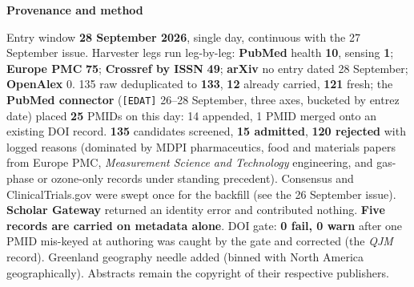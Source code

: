 \documentclass[10pt]{article}
\begin{document}
\begin{keybox}
{\sffamily\bfseries\footnotesize\color{Deep}Provenance and method}\\[1.2mm]
{\fontsize{7.2}{8.8}\selectfont
Entry window \textbf{28 September 2026}, single day, continuous with the 27 September issue.
Harvester legs run leg-by-leg: \textbf{PubMed} health \textbf{10}, sensing \textbf{1}; \textbf{Europe
PMC} \textbf{75}; \textbf{Crossref by ISSN} \textbf{49}; \textbf{arXiv} no entry dated 28 September;
\textbf{OpenAlex} 0. 135 raw deduplicated to \textbf{133}, \textbf{12} already carried, \textbf{121}
fresh; the \textbf{PubMed connector} (\texttt{[EDAT]} 26--28 September, three axes, bucketed by entrez
date) placed \textbf{25} PMIDs on this day: 14 appended, 1 PMID merged onto an existing DOI record.
\textbf{135} candidates screened, \textbf{15 admitted}, \textbf{120 rejected} with logged reasons
(dominated by MDPI pharmaceutics, food and materials papers from Europe PMC, \textit{Measurement
Science and Technology} engineering, and gas-phase or ozone-only records under standing precedent).
Consensus and ClinicalTrials.gov were swept once for the backfill (see the 26 September issue).
\textbf{Scholar Gateway} returned an identity error and contributed nothing. \textbf{Five records are
carried on metadata alone}. DOI gate: \textbf{0 fail, 0 warn} after one PMID mis-keyed at authoring
was caught by the gate and corrected (the \textit{QJM} record). Greenland geography needle added
(binned with North America geographically). Abstracts remain the copyright of their respective
publishers.\par}
\end{keybox}
\end{document}
